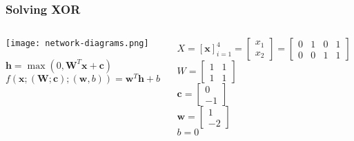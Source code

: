 \begin{frame}
\frametitle{Solving XOR}
\begin{columns}
\begin{column}{.4\textwidth}
\centering
\begin{center}
\texttt{[image: network-diagrams.png]}
\end{center}
$
\textbf{h} = \max(0, \textbf{W}^{T}\textbf{x} + \textbf{c})
$\\
$
f(\textbf{x}; (\textbf{W}; \textbf{c}); (\textbf{w}, b)) = \textbf{w}^{T} \textbf{h} + b
$
\end{column}
\begin{column}{.6\textwidth}
$
X = \left [
\textbf{x}
\right ]_{i=1}^{4}
=
\left [
\begin{array}{c}
x_1 \\
x_2
\end{array}
\right ]
=
\left [
\begin{array}{cccc}
0 & 1 & 0 & 1 \\
0 & 0 & 1 & 1
\end{array}
\right ]
$\\
$
W = 
\left [
\begin{array}{cc}
1 & 1 \\
1 & 1
\end{array}
\right ]
$\\
$
\textbf{c} =
\left [
\begin{array}{c}
0 \\
-1
\end{array}
\right ]
$\\
$
\textbf{w} =
\left [
\begin{array}{c}
1 \\
-2
\end{array}
\right ]
$\\
$
b = 0
$
\end{column}
\end{columns}
\end{frame}


